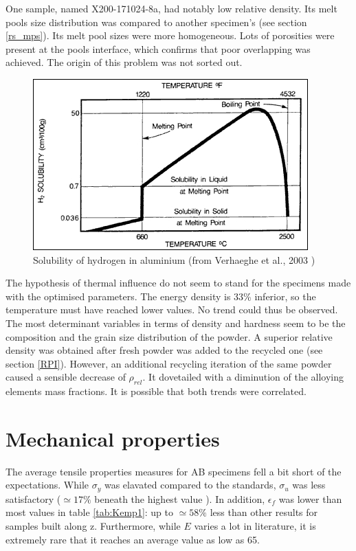 One sample, named X200-171024-8a, had notably low relative density. Its melt pools size distribution was compared to another specimen's (see section \ref{rs_mps}). Its melt pool sizes were more homogeneous. Lots of porosities were present at the pools interface, which confirms that poor overlapping was achieved. The origin of this problem was not sorted out. \\


\begin{figure}[ht]
	\centering
	\centerline{\includegraphics[scale=0.75]{Images/Solub}}
	\decoRule
	\caption[Solubility of hydrogen in aluminium.]{Solubility of hydrogen in aluminium (from Verhaeghe et al., 2003 \parencite{Verhaeghe})}
	\label{fig:Solub}
\end{figure}

The hypothesis of thermal influence do not seem to stand for the specimens made with the optimised parameters. The energy density is 33\% inferior, so the temperature must have reached lower values. No trend could thus be observed. The most determinant variables in terms of density and hardness seem to be the composition and the grain size distribution of the powder. A superior relative density was obtained after fresh powder was added to the recycled one (see section \ref{RPI}). However, an additional recycling iteration of the same powder caused a sensible decrease of $\rho_{rel}$. It dovetailed with a diminution of the alloying elements mass fractions. It is possible that both trends were correlated.

\section{Mechanical properties}
\label{DMPP}
The average tensile properties measures for AB specimens fell a bit short of the expectations. While $\sigma_y$ was elavated compared to the standards, $\sigma_u$ was less satisfactory ($\simeq 17\%$ beneath the highest value \parencite{EOS}). In addition, $\epsilon_f$ was lower than most values in table \ref{tab:Kemp1}: up to $\simeq 58\%$ less than other results for samples built along z.  Furthermore, while $E$ varies a lot in literature, it is extremely rare that it reaches an average value as low as 65. \\

